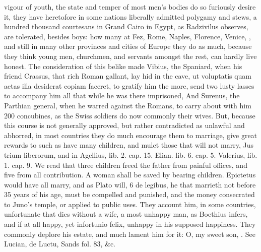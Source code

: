vigour of youth, the state and temper of most men's bodies do so
furiously desire it, they have heretofore in some nations liberally
admitted polygamy and stews, a hundred thousand courtesans in Grand
Cairo in Egypt, as Radzivilus observes, are tolerated, besides
boys: how many at Fez, Rome, Naples, Florence, Venice, \etc{}, and still
in many other provinces and cities of Europe they do as much, because
they think young men, churchmen, and servants amongst the rest, can
hardly live honest. The consideration of this belike made Vibius, the
Spaniard, when his friend Crassus, that rich Roman gallant, lay
hid in the cave, ut voluptatis quam aetas illa desiderat copiam
faceret, to gratify him the more, send two lusty lasses to
accompany him all that while he was there imprisoned, And Surenus, the
Parthian general, when he warred against the Romans, to carry about
with him 200 concubines, as the Swiss soldiers do now commonly their
wives. But, because this course is not generally approved, but rather
contradicted as unlawful and abhorred, in most countries they do
much encourage them to marriage, give great rewards to such as have
many children, and mulct those that will not marry, Jus trium
liberorum, and in Agellius, lib. 2. cap. 15. Elian. lib. 6. cap. 5.
Valerius, lib. 1. cap. 9. We read that three children freed the
father from painful offices, and five from all contribution. A woman
shall be saved by bearing children. Epictetus would have all marry, and
as Plato will, 6 de legibus, he that marrieth not before 35 years
of his age, must be compelled and punished, and the money consecrated
to Juno's temple, or applied to public uses. They account him, in
some countries, unfortunate that dies without a wife, a most unhappy
man, as Boethius infers, and if at all happy, yet infortunio
felix, unhappy in his supposed happiness. They commonly deplore his
estate, and much lament him for it: O, my sweet son, \etc{}. See Lucian, de
Luctu, Sands fol. 83, \&c.

